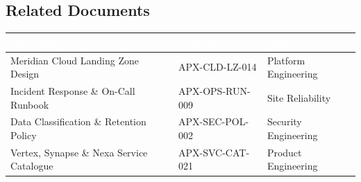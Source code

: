 \subsection{Related Documents}
\begin{center}
\begin{tabularx}{\linewidth}{@{}L l l@{}}
\toprule
{}
\textcolor{white}{\textbf{Document}} & \textcolor{white}{\textbf{Reference}} & \textcolor{white}{\textbf{Owner}} \\
\midrule
Meridian Cloud Landing Zone Design & APX-CLD-LZ-014 & Platform Engineering \\
Incident Response \& On-Call Runbook & APX-OPS-RUN-009 & Site Reliability \\
Data Classification \& Retention Policy & APX-SEC-POL-002 & Security Engineering \\
Vertex, Synapse \& Nexa Service Catalogue & APX-SVC-CAT-021 & Product Engineering \\
\bottomrule
\end{tabularx}
\end{center}
